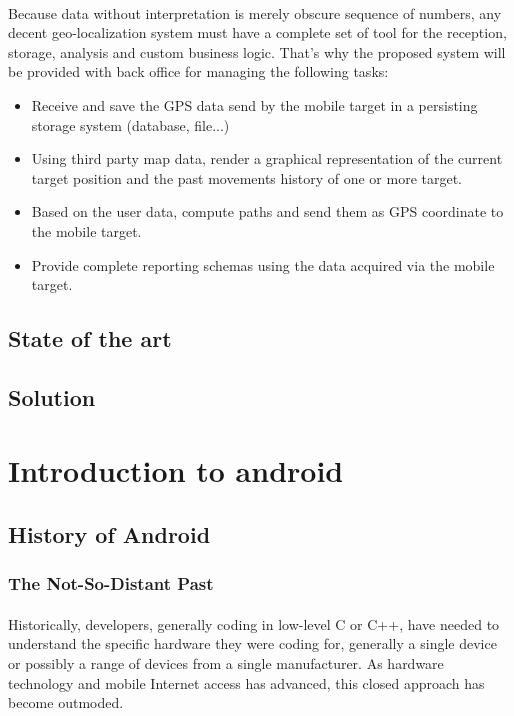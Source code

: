 \paragraph{}
Because data without interpretation is merely obscure sequence of numbers, any decent geo-localization system must have a complete set of tool for the reception, storage, analysis and custom business logic. That's why the proposed system will be provided with back office for managing the following tasks:
\begin{itemize}
\item Receive and save the GPS data send by the mobile target in a persisting storage system (database, file...)
\item Using third party map data, render a graphical representation of the current target position and the past movements history of one or more target.
\item Based on the user data, compute paths and send them as GPS coordinate to the mobile target.
\item Provide complete reporting schemas using the data acquired via the mobile target.
\end{itemize}

\subsection{State of the art}
\subsection{Solution}
\paragraph{}


\section{Introduction to android}
\subsection{History of Android}
\subsubsection{The Not-So-Distant Past}

\paragraph{}
Historically, developers, generally coding in low-level C or C++, have needed to understand the specific
hardware they were coding for, generally a single device or possibly a range of devices from a single
manufacturer. As hardware technology and mobile Internet access has advanced, this closed approach
has become outmoded.

